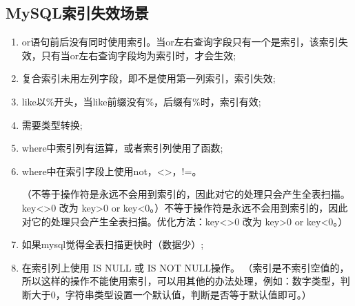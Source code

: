 \documentclass[../../../interview-questions.tex]{subfiles}
\begin{document}
\subsection{MySQL索引失效场景}

\begin{enumerate}
\item {or语句前后没有同时使用索引。当or左右查询字段只有一个是索引，该索引失效，只有当or左右查询字段均为索引时，才会生效;}
\item {复合索引未用左列字段，即不是使用第一列索引，索引失效;}
\item {like以\%开头，当like前缀没有\%，后缀有\%时，索引有效;}
\item {需要类型转换;}
\item {where中索引列有运算，或者索引列使用了函数;}
\item {where中在索引字段上使用not，<>，!=。}

  （不等于操作符是永远不会用到索引的，因此对它的处理只会产生全表扫描。key<>0 改为 key>0 or key<0。）不等于操作符是永远不会用到索引的，因此对它的处理只会产生全表扫描。优化方法：key<>0 改为 key>0 or key<0。）
\item {如果mysql觉得全表扫描更快时（数据少）;}
\item {在索引列上使用 IS NULL 或 IS NOT NULL操作。}
（索引是不索引空值的，所以这样的操作不能使用索引，可以用其他的办法处理，例如：数字类型，判断大于0，字符串类型设置一个默认值，判断是否等于默认值即可。）
\end{enumerate}
\end{document}
